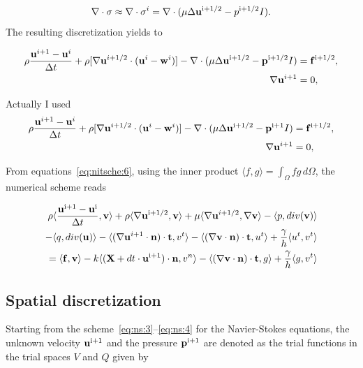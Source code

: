 \documentclass[11pt,a4paper,titlepage]{report}
\begin{document}
\begin{equation}
\nabla \cdot \sigma \approx \nabla \cdot \sigma^i = \nabla \cdot (\mu \Delta \mathbf{u}^{\rm i+1/2} - p^{\rm i+1/2} I).
\end{equation}
The resulting discretization yields to

\begin{align}
\rho \frac{\mathbf{u}^{i+1} - \mathbf{u}^i}{\Delta t} + \rho [\nabla \mathbf{u}^{i+1/2} \cdot (\mathbf{u}^i - \mathbf{w}^i)] - \nabla \cdot (\mu \Delta \mathbf{u}^{\rm  i+1/2} - \mathbf{p}^{\rm i+1/2}I) &= \mathbf{f}^{\rm i+1/2}, \\
\nabla \mathbf{u}^{i+1} &= 0,
\end{align}

Actually I used
\begin{align}
 \label{eq:ns:3}
\rho \frac{\mathbf{u}^{i+1} - \mathbf{u}^i}{\Delta t} + \rho [\nabla \mathbf{u}^{i+1/2} \cdot (\mathbf{u}^i - \mathbf{w}^i)] - \nabla \cdot (\mu \Delta \mathbf{u}^{\rm  i+1/2} - \mathbf{p}^{\rm i+1}I) &= \mathbf{f}^{\rm i+1/2}, \\
 \label{eq:ns:4}
\nabla \mathbf{u}^{i+1} &= 0,
\end{align}

From equations~\eqref{eq:nitsche:6}, using the inner product $\langle f, g \rangle = \int_\Omega f g \, d \Omega$, the numerical scheme reads

\begin{align}
\rho \langle \frac{\mathbf{u}^{\rm i+1} - \mathbf{u}^{\rm i}}{\Delta t}, \mathbf{v} \rangle 
+ \rho \langle \nabla \mathbf{u}^{\rm i+1/2}, \mathbf{v} \rangle 
+ \mu \langle \nabla \mathbf{u}^{i+1/2} , \nabla \mathbf{v} \rangle 
- \langle p , div(\mathbf{v}) \rangle \\
- \langle q , div(\mathbf{u}) \rangle
- \langle (\nabla \mathbf{u}^{i+1} \cdot \mathbf{n}) \cdot \mathbf{t} , v^t \rangle 
- \langle (\nabla \mathbf{v} \cdot \mathbf{n}) \cdot \mathbf{t} , u^t \rangle 
+ \frac{\gamma}{h} \langle u^t , v^t \rangle \\
= \langle \mathbf{f}, \mathbf{v} \rangle
- k \langle (\mathbf{X} + dt \cdot \mathbf{u}^{\rm i+1}) \cdot \mathbf{n}, v^n \rangle
- \langle (\nabla \mathbf{v} \cdot \mathbf{n}) \cdot \mathbf{t}, g \rangle
+ \frac{\gamma}{h} \langle g, v^t \rangle
\end{align}

\subsection{Spatial discretization}
Starting from the scheme~\eqref{eq:ns:3}--\eqref{eq:ns:4} for the Navier-Stokes equations, the unknown velocity $\mathbf{u}^{\rm i + 1}$ and the pressure $\mathbf{p}^{\rm i + 1}$ are denoted as the trial functions in the trial spaces $V$ and $Q$ given by
\end{document}

